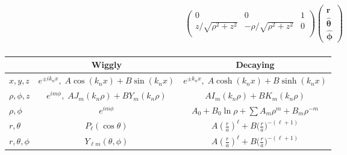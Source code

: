 \documentclass[10pt]{article}
\newcommand{\rhat}{\boldsymbol{\hat{\textbf{r}}}}
\newcommand{\phihat}{\boldsymbol{\hat{\textbf{$\phi$}}}}
\newcommand{\thetahat}{\boldsymbol{\hat{\textbf{$\theta$}}}}
\begin{document}
\begin{multicols}{2}
\begin{align*}
\begin{pmatrix}
 			0 & 0 & 1 \\
 			z / \sqrt{\rho^2 + z^2} & - \rho /\sqrt{\rho^2 + z^2} & 0 \\
 		\end{pmatrix}
 		\begin{pmatrix}
			\rhat \\
			\thetahat \\
			\phihat
 		\end{pmatrix} \\
 	\end{align*}
	\renewcommand{\arraystretch}{2}
	\begin{tabular}{| l | c | c |} \hline
		& Wiggly & Decaying \\ \hline
		$x,y,z$ &$ e^{\pm i k_n x}, \; A \cos(k_n x) + B\sin(k_n x)$ & $e^{\pm k_n x}, \; A \cosh( k_n x) + B \sinh(k_n x)$ \\ \hline
		$\rho,\phi,z$ & $e^{i m \phi}, \; A J_m(k_n \rho) + B Y_m(k_n \rho)$ & $ A I_m(k_n \rho) + B K_m(k_n \rho)$ \\ \hline
		$\rho,\phi$ & $e^{i m \phi}$ & $A_0 + B_0 \ln \rho + \sum A_m \rho^m + B_m \rho^{-m}$ \\ \hline
		$r,\theta$ & $P_\ell(\cos \theta)$ & $A \left( \frac{r}{a} \right)^\ell + B \big( \frac{r}{a} \big)^{-(\ell+1)} $ \\ \hline
		$r, \theta, \phi$ & $Y_{\ell m}(\theta, \phi)$ &  $A \left( \frac{r}{a} \right)^\ell + B \big( \frac{r}{a} \big)^{-(\ell+1)} $ \\ \hline
	\end{tabular}
\end{multicols}
 
\end{document}
